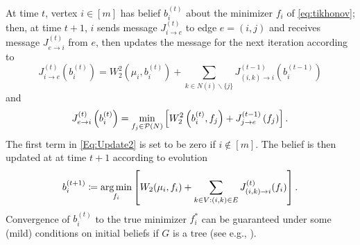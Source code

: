 \documentclass[letterpaper]{article} %
\begin{document}
At time $t$, vertex $i\in [m]$ has belief $b^{(t)}_i$ about the minimizer $f_i$ of \eqref{eq:tikhonov}; then, at time $t+1$, $i$ sends message $J^{(t)}_{i\to e}$ to edge $e=(i, j)$ and receives message $J^{(t)}_{e\to i}$ from $e$, then updates the message for the next iteration according to
\begin{equation}\label{Eq:Update2}
J^{(t)}_{i\to e} \left(b^{(t)}_i\right) = W_2^2\left(\mu_i, b^{(t)}_i\right) + \sum_{k\in N(i)\backslash \{j\}}J^{(t-1)}_{(i,k)\to i}\left(b^{(t-1)}_i\right)
\end{equation}
and 
\begin{equation}\label{Eq:Update}
    J^{(t)}_{e\to i}\left(b^{(t)}_i\right) =  \min_{f_j\in \P(N)}\left[W_2^2\left(b^{(t)}_i, f_j\right) + J^{(t-1)}_{j\to e}\left(f_j\right)\right].
\end{equation}
The first term in \eqref{Eq:Update2} is set to be zero if $i\notin [m]$. The belief is then updated at at time $t+1$ according to evolution
\begin{equation*}
b^{(t+1)}_i \coloneqq \argmin_{f_i} \left[W_2(\mu_i, f_i) + \sum_{k\in V: (i, k)\in E } J^{(t)}_{(i, k)\to i}(f_i)\right].
\end{equation*}
Convergence of $b_i^{(t)}$ to the true minimizer $f^*_i$ can be guaranteed under some (mild) conditions on initial beliefs if $G$ is a tree (see e.g., \cite{min_Sum}).
\end{document}
